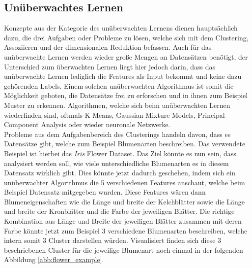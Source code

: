 \documentclass[]{iat}
\begin{document}
\subsection{Unüberwachtes Lernen} \label{sec:unueberwachtes_lernen}
Konzepte aus der Kategorie des unüberwachten Lernens dienen hauptsächlich dazu, die drei Aufgaben oder Probleme zu lösen, welche sich mit dem Clustering, Assoziieren und der dimensionalen Reduktion befassen. Auch für das unüberwachte Lernen werden wieder große Mengen an Datensätzen benötigt, der Unterschied zum überwachten Lernen liegt hier jedoch darin, dass das unüberwachte Lernen lediglich die Features als Input bekommt und keine dazu gehörenden Labels. Einem solchen unüberwachten Algorithmus ist somit die Möglichkeit geboten, die Datensätze frei zu erforschen und in ihnen zum Beispiel Muster zu erkennen. Algorithmen, welche sich beim unüberwachten Lernen wiederfinden sind, oftmals K-Means, Gaussian Mixture Models, Principal Component Analysis oder wieder neuronale Netzwerke.\\
Probleme aus dem Aufgabenbereich des Clusterings handeln davon, dass es Datensätze gibt, welche zum Beispiel Blumenarten beschreiben. Das verwendete Beispiel ist hierbei das \textit{Iris} Flower Dataset. Das Ziel könnte es nun sein, dass analysiert werden soll, wie viele unterschiedliche Blumenarten es in diesem Datensatz wirklich gibt. Dies könnte jetzt dadurch geschehen, indem sich ein unüberwachter Algorithmus die 5 verschiedenen Features anschaut, welche beim Beispiel Datensatz mitgegeben wurden. Diese Features wären dann Blumeneigenschaften wie die Länge und breite der Kelchblätter sowie die Länge und breite der Kronblätter und die Farbe der jeweiligen Blätter. Die richtige Kombination aus Länge und Breite der jeweiligen Blätter zusammen mit deren Farbe könnte jetzt zum Beispiel 3 verschiedene Blumenarten beschreiben, welche intern somit 3 Cluster darstellen würden. Visualisiert finden sich diese 3 beschriebenen Cluster für die jeweilige Blumenart noch einmal in der folgenden Abbildung \ref{abb:flower_example}.
\end{document}
